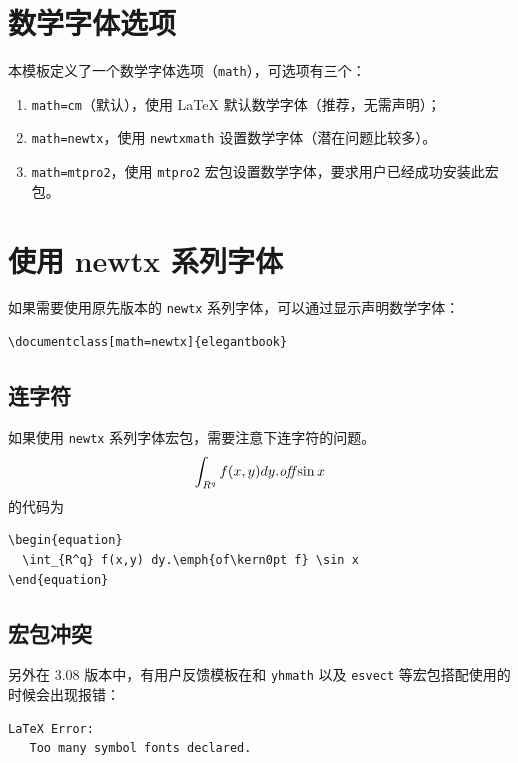 \documentclass[lang=cn,newtx,10pt,scheme=chinese]{elegantbook}
\begin{document}
\section{数学字体选项}

本模板定义了一个数学字体选项（\lstinline{math}），可选项有三个：
\begin{enumerate}
  \item \lstinline{math=cm}（默认），使用 \LaTeX{} 默认数学字体（推荐，无需声明）；
  \item \lstinline{math=newtx}，使用 \lstinline{newtxmath} 设置数学字体（潜在问题比较多）。
  \item \lstinline{math=mtpro2}，使用 \lstinline{mtpro2} 宏包设置数学字体，要求用户已经成功安装此宏包。
\end{enumerate}

\section{使用 newtx 系列字体}

如果需要使用原先版本的 \lstinline{newtx} 系列字体，可以通过显示声明数学字体：

\begin{lstlisting}
\documentclass[math=newtx]{elegantbook}
\end{lstlisting}

\subsection{连字符}

如果使用 \lstinline{newtx} 系列字体宏包，需要注意下连字符的问题。
\begin{equation}
  \int_{R^q} f(x,y) dy.\emph{of\kern0pt f} \sin x
\end{equation}
的代码为
\begin{lstlisting}
\begin{equation}
  \int_{R^q} f(x,y) dy.\emph{of\kern0pt f} \sin x
\end{equation}
\end{lstlisting}

\subsection{宏包冲突}

另外在 3.08 版本中，有用户反馈模板在和 \lstinline{yhmath} 以及 \lstinline{esvect} 等宏包搭配使用的时候会出现报错：
\begin{lstlisting}
LaTeX Error:
   Too many symbol fonts declared.
\end{lstlisting}
\end{document}
